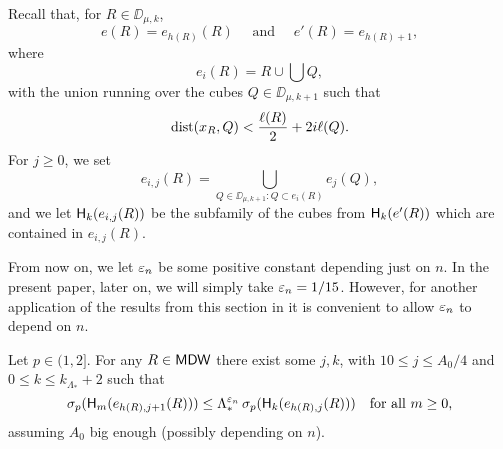 Recall that, for $R\in\DD_{\mu,k}$,
$$e(R) = e_{h(R)}(R) \quad \mbox{ and }\quad e'(R) = e_{h(R)+1},$$
where
$$e_i(R) = R \cup \bigcup Q,$$
with the union running over the cubes $Q\in\DD_{\mu,k+1}$ such that
$$
{\rm dist}(x_R,Q)< \frac{\ell(R)}2 + 2i\ell(Q).
$$
For $j\geq0$, we set 
$$e_{i,j}(R) = \bigcup_{Q\in\DD_{\mu,k+1}:Q\subset e_i(R)} e_j(Q),$$
and we let ${\mathsf{H}}_k(e_{i,j}(R))$ be the subfamily of the cubes from ${\mathsf{H}}_k(e'(R))$ which are contained
in $e_{i,j}(R)$.


From now on, we let ${\varepsilon}_n$ be some positive constant depending just on $n$. In the present paper, later on, we will simply
take ${\varepsilon}_n=1/15$. However, for another application of the results from this section in \cite{Tolsa-riesz} it
is convenient to allow ${\varepsilon}_n$ to depend on $n$.

\vv
\begin{lemma}\label{lem:66}
Let $p\in (1,2]$.
For any $R\in{\mathsf{MDW}}$ there exist some $j,k$, with $10\leq j\leq A_0/4$ and  $0\leq k\leq k_{\Lambda_*}+2$ such that
\begin{equation}\label{eqsigmah}
\sigma_p({\mathsf{H}}_{m}(e_{h(R),j+1}(R))) \leq \Lambda_*^{{\varepsilon}_n} \,\sigma_p({\mathsf{H}}_{k}(e_{h(R),j}(R)))
\quad \mbox{for all $m\geq0$,}
\end{equation}
 assuming $A_0$ big enough (possibly depending on $n$). 
\end{lemma}

